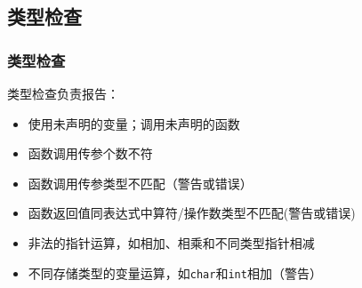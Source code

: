 \documentclass{beamer}
\begin{document}
\subsection{类型检查}
\begin{frame}
	\frametitle{类型检查}
\noindent
	类型检查负责报告：
	\begin{itemize}
		\item 使用未声明的变量；调用未声明的函数
		\item 函数调用传参个数不符
		\item 函数调用传参类型不匹配（警告或错误）
		\item 函数返回值同表达式中算符/操作数类型不匹配(警告或错误)
		\item 非法的指针运算，如相加、相乘和不同类型指针相减
		\item 不同存储类型的变量运算，如\lstinline|char|和\lstinline|int|相加（警告）
	\end{itemize}
\end{frame}
\end{document}
